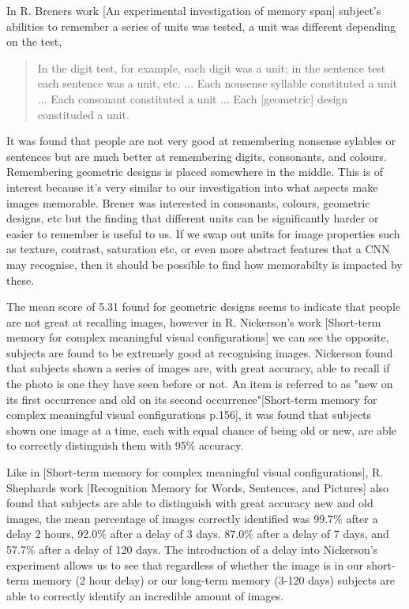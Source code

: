 \documentclass{UoYCSproject}
\begin{document}
In R. Breners work [An experimental investigation of memory span] subject's abilities to remember a series of units was tested, a unit was different depending on the test, 
\begin{quote}
    In the digit test, for example, each digit was a unit; in the sentence test each sentence was a unit, etc. ... Each nonsense syllable constituted a unit ... Each consonant constituted a unit ... Each [geometric] design constituded a unit. 
\end{quote}
It was found that people are not very good at remembering nonsense sylables or sentences but are much better at remembering digits, consonants, and colours. Remembering geometric designs is placed somewhere in the middle. This is of interest because it's very similar to our investigation into what aspects make images memorable. Brener was interested in consonants, colours, geometric designs, etc but the finding that different units can be significantly harder or easier to remember is useful to us. If we swap out units for image properties such as texture, contrast, saturation etc, or even more abstract features that a CNN may recognise, then it should be possible to find how memorabilty is impacted by these.   

The mean score of 5.31 found for geometric designs seems to indicate that people are not great at recalling images, however in R. Nickerson's work [Short-term memory for complex meaningful visual configurations] we can see the opposite, subjects are found to be extremely good at recognising images. Nickerson found that subjects shown a series of images are, with great accuracy, able to recall if the photo is one they have seen before or not. An item is referred to as "new on its first occurrence and old on its second occurrence"[Short-term memory for complex meaningful visual configurations p.156], it was found that subjects shown one image at a time, each with equal chance of being old or new, are able to correctly distinguish them with 95\% accuracy. 

Like in [Short-term memory for complex meaningful visual configurations],  R. Shephards work [Recognition Memory for Words, Sentences, and Pictures] also found that subjects are able to distinguish with great accuracy new and old images, the mean percentage of images correctly identified was 99.7\% after a delay 2 hours, 92.0\% after a delay of 3 days. 87.0\% after a delay of 7 days, and 57.7\% after a delay of 120 days. The introduction of a delay into Nickerson's experiment allows us to see that regardless of whether the image is in our short-term memory (2 hour delay) or our long-term memory (3-120 days) subjects are able to correctly identify an incredible amount of images. 
\end{document}
